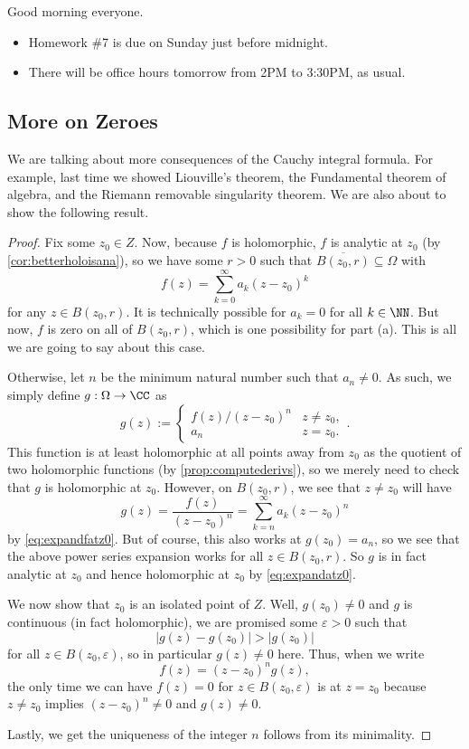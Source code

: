 
Good morning everyone.
\begin{itemize}
	\item Homework \#7 is due on Sunday just before midnight.
	\item There will be office hours tomorrow from 2PM to 3:30PM, as usual.
\end{itemize}

\subsection{More on Zeroes}
We are talking about more consequences of the Cauchy integral formula. For example, last time we showed Liouville's theorem, the Fundamental theorem of algebra, and the Riemann removable singularity theorem. We are also about to show the following result.
\isolatezeroes*
\begin{proof}
	Fix some $z_0\in Z$. Now, because $f$ is holomorphic, $f$ is analytic at $z_0$ (by \autoref{cor:betterholoisana}), so we have some $r>0$ such that $\overline{B(z_0,r)}\subseteq\Omega$ with
	\[f(z)=\sum_{k=0}^\infty a_k(z-z_0)^k\tag{$*$}\label{eq:expandfatz0}\]
	for any $z\in B(z_0,r)$. It is technically possible for $a_k=0$ for all $k\in\NN$. But now, $f$ is zero on all of $B(z_0,r)$, which is one possibility for part (a). This is all we are going to say about this case.
	
	Otherwise, let $n$ be the minimum natural number such that $a_n\ne0$. As such, we simply define $g:\Omega\to\CC$ as
	\[g(z):=\begin{cases}
		f(z)/(z-z_0)^n & z\ne z_0, \\
		a_n & z=z_0.
	\end{cases}.\]
	This function is at least holomorphic at all points away from $z_0$ as the quotient of two holomorphic functions (by \autoref{prop:computederivs}), so we merely need to check that $g$ is holomorphic at $z_0$. However, on $B(z_0,r)$, we see that $z\ne z_0$ will have
	\[g(z)=\frac{f(z)}{(z-z_0)^n}=\sum_{k=n}^\infty a_k(z-z_0)^n\]
	by \autoref{eq:expandfatz0}. But of course, this also works at $g(z_0)=a_n$, so we see that the above power series expansion works for all $z\in B(z_0,r)$. So $g$ is in fact analytic at $z_0$ and hence holomorphic at $z_0$ by \autoref{eq:expandatz0}.

	We now show that $z_0$ is an isolated point of $Z$. Well, $g(z_0)\ne0$ and $g$ is continuous (in fact holomorphic), we are promised some $\varepsilon>0$ such that
	\[|g(z)-g(z_0)|>|g(z_0)|\]
	for all $z\in B(z_0,\varepsilon)$, so in particular $g(z)\ne0$ here. Thus, when we write
	\[f(z)=(z-z_0)^ng(z),\]
	the only time we can have $f(z)=0$ for $z\in B(z_0,\varepsilon)$ is at $z=z_0$ because $z\ne z_0$ implies $(z-z_0)^n\ne0$ and $g(z)\ne0$.

	Lastly, we get the uniqueness of the integer $n$ follows from its minimality. %
\end{proof}
